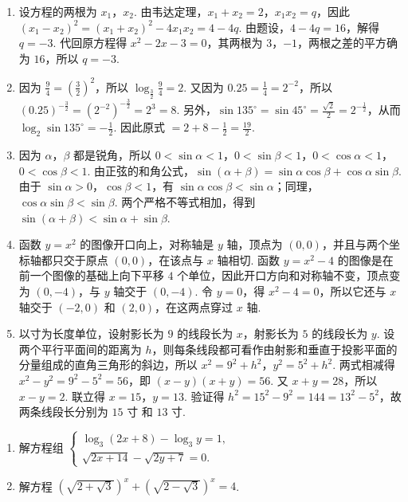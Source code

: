 \begin{solution}
\begin{enumerate}
\item 设方程的两根为 \(x_{1}\)，\(x_{2}\). 由韦达定理，\(x_{1}+x_{2}=2\)，\(x_{1}x_{2}=q\)，因此 \(\left(x_{1}-x_{2}\right)^{2}=\left(x_{1}+x_{2}\right)^{2}-4x_{1}x_{2}=4-4q\). 由题设，\(4-4q=16\)，解得 \(q=-3\). 代回原方程得 \(x^{2}-2x-3=0\)，其两根为 \(3\)，\(-1\)，两根之差的平方确为 \(16\)，所以 \(q=-3\).
\item 因为 \(\frac{9}{4}=\left(\frac{3}{2}\right)^{2}\)，所以 \(\log_{\frac{3}{2}}\frac{9}{4}=2\). 又因为 \(0.25=\frac{1}{4}=2^{-2}\)，所以 \(\left(0.25\right)^{-\frac{3}{2}}=\left(2^{-2}\right)^{-\frac{3}{2}}=2^{3}=8\). 另外，\(\sin135^{\circ}=\sin45^{\circ}=\frac{\sqrt{2}}{2}=2^{-\frac{1}{2}}\)，从而 \(\log_{2}\sin135^{\circ}=-\frac{1}{2}\). 因此原式 \(=2+8-\frac{1}{2}=\frac{19}{2}\).
\item 因为 \(\alpha\)，\(\beta\) 都是锐角，所以 \(0<\sin\alpha<1\)，\(0<\sin\beta<1\)，\(0<\cos\alpha<1\)，\(0<\cos\beta<1\). 由正弦的和角公式，\(\sin\left(\alpha+\beta\right)=\sin\alpha\cos\beta+\cos\alpha\sin\beta\). 由于 \(\sin\alpha>0\)，\(\cos\beta<1\)，有 \(\sin\alpha\cos\beta<\sin\alpha\)；同理，\(\cos\alpha\sin\beta<\sin\beta\). 两个严格不等式相加，得到 \(\sin\left(\alpha+\beta\right)<\sin\alpha+\sin\beta\).
\item 函数 \(y=x^{2}\) 的图像开口向上，对称轴是 \(y\) 轴，顶点为 \(\left(0,0\right)\)，并且与两个坐标轴都只交于原点 \(\left(0,0\right)\)，在该点与 \(x\) 轴相切. 函数 \(y=x^{2}-4\) 的图像是在前一个图像的基础上向下平移 \(4\) 个单位，因此开口方向和对称轴不变，顶点变为 \(\left(0,-4\right)\)，与 \(y\) 轴交于 \(\left(0,-4\right)\). 令 \(y=0\)，得 \(x^{2}-4=0\)，所以它还与 \(x\) 轴交于 \(\left(-2,0\right)\) 和 \(\left(2,0\right)\)，在这两点穿过 \(x\) 轴.
\item 以寸为长度单位，设射影长为 \(9\) 的线段长为 \(x\)，射影长为 \(5\) 的线段长为 \(y\). 设两个平行平面间的距离为 \(h\)，则每条线段都可看作由射影和垂直于投影平面的分量组成的直角三角形的斜边，所以 \(x^{2}=9^{2}+h^{2}\)，\(y^{2}=5^{2}+h^{2}\). 两式相减得 \(x^{2}-y^{2}=9^{2}-5^{2}=56\)，即 \(\left(x-y\right)\left(x+y\right)=56\). 又 \(x+y=28\)，所以 \(x-y=2\). 联立得 \(x=15\)，\(y=13\). 验证得 \(h^{2}=15^{2}-9^{2}=144=13^{2}-5^{2}\)，故两条线段长分别为 \(15\text{ 寸}\) 和 \(13\text{ 寸}\).
\end{enumerate}
\end{solution}

\begin{problem}
\begin{enumerate}
\item 解方程组 \(\begin{cases}
\log_{3}\left(2x+8\right)-\log_{3}y=1,\\
\sqrt{2x+14}-\sqrt{2y+7}=0.
\end{cases}\)
\item 解方程 \(\left(\sqrt{2+\sqrt{3}}\right)^{x}+\left(\sqrt{2-\sqrt{3}}\right)^{x}=4\).
\end{enumerate}
\end{problem}

